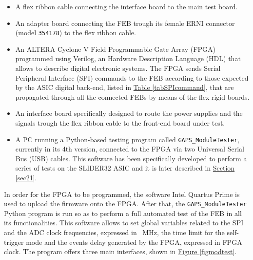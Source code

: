\begin{itemize}
    \item A flex ribbon cable connecting the interface board to the main test board.
    \item An adapter board connecting the FEB trough its female ERNI connector (model \texttt{354178}) to the flex ribbon cable.
    \item An ALTERA Cyclone V Field Programmable Gate Array (FPGA) programmed using Verilog, an Hardware Description Language (HDL) that allows to describe digital electronic systems. The FPGA sends Serial Peripheral Interface (SPI) commands to the FEB according to those expected by the ASIC digital back-end, listed in \hyperref[tabSPIcommand]{Table \ref{tabSPIcommand}}, that are propagated through all the connected FEBs by means of the flex-rigid boards.
    \item An interface board specifically designed to route the power supplies and the signals trough the flex ribbon cable to the front-end board under test.
    \item A PC running a Python-based testing program called \texttt{GAPS\_ModuleTester}, currently in its 4th version, connected to the FPGA via two Universal Serial Bus (USB) cables. This software has been specifically developed to perform a series of tests on the SLIDER32 ASIC and it is later described in \hyperref[sec21]{Section \ref{sec21}}.
\end{itemize}

\noindent
In order for the FPGA to be programmed, the software Intel Quartus Prime is used to upload the firmware onto the FPGA. After that, the \texttt{GAPS\_ModuleTester} Python program is run so as to perform a full automated test of the FEB in all its functionalities. This software allows to set global variables related to the SPI and the ADC clock frequencies, expressed in \SI{}{\mega\hertz}, the time limit for the self-trigger mode and the events delay generated by the FPGA, expressed in FPGA clock. The program offers three main interfaces, shown in \hyperref[figmodtest]{Figure \ref{figmodtest}}.

